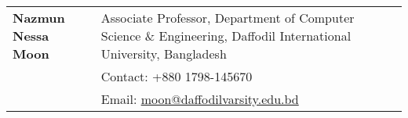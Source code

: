 \documentclass[a4paper,12pt]{article}
\begin{document}
\begin{tabularx}{\linewidth}{@{}l X@{}}
        \textbf{Nazmun Nessa Moon}      & Associate Professor, Department of Computer Science \& Engineering, \newline Daffodil International University, Bangladesh \\
        & Contact: +880 1798-145670                                                                                                  \\
        & Email: \href{mailto:moon@daffodilvarsity.edu.bd}{moon@daffodilvarsity.edu.bd} \\[3.75pt]
    \end{tabularx}


    \vfill
\end{document}
